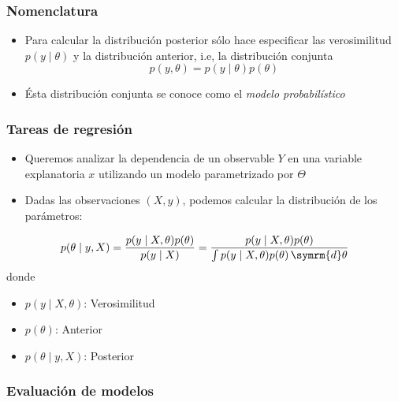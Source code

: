 \documentclass[xcolor=dvipsnames,10pt]{beamer}
\begin{document}
%
\begin{frame}
  \frametitle{Nomenclatura}
  \begin{itemize}
  \item Para calcular la distribución posterior sólo hace especificar las verosimilitud $p(y \mid \theta)$ y la distribución anterior, i.e, la distribución conjunta
    \begin{equation*}
      p(y, \theta) = p(y \mid \theta) p(\theta)
    \end{equation*}
  \item Ésta distribución conjunta se conoce como el \emph{modelo probabilístico}
  \end{itemize}
\end{frame}
%
\begin{frame}
  \frametitle{Tareas de regresión}
  \begin{itemize}
  \item Queremos analizar la dependencia de un observable $Y$ en una variable explanatoria $x$ utilizando un modelo parametrizado por $\Theta$
  \item Dadas las observaciones $(X, y)$, podemos calcular la distribución de los parámetros:
  \end{itemize}
  \begin{equation*}
    p(\theta \mid y, X) = \frac{p(y \mid X, \theta) p(\theta)}{p(y \mid X)} = \frac{p(y \mid X, \theta) p(\theta)}{\int p(y \mid X, \theta) p(\theta) \, \symrm{d} \theta}
  \end{equation*}
  donde
  \begin{itemize}
  \item $p(y \mid X, \theta)$: Verosimilitud
  \item $p(\theta)$: Anterior
  \item $p(\theta \mid y, X)$: Posterior
  \end{itemize}
\end{frame}
%
\begin{frame}
  \pythonframe
\end{frame}
%
\begin{frame}
  \frametitle{Evaluación de modelos}
\end{frame}
%
\begin{frame}
  \pythonframe
\end{frame}
%
\end{document}
